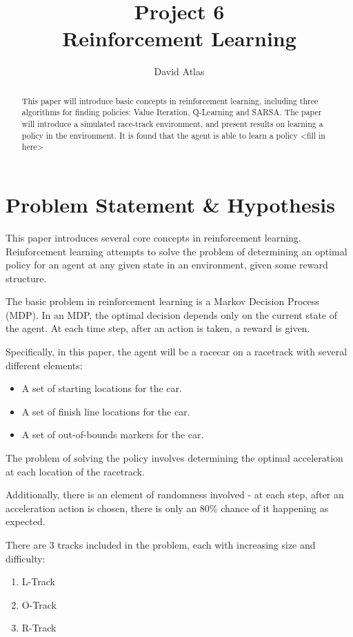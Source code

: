 \documentclass{amsart}
\title{Project 6 \\ Reinforcement Learning}
\author{David Atlas}
\begin{document}
    \begin{abstract}
    This paper will introduce basic concepts in reinforcement
    learning, including three algorithms for finding policies: Value Iteration, Q-Learning and SARSA.
        The paper will introduce a simulated race-track environment, and present results on
        learning a policy in the environment. It is found that the agent is able
        to learn a policy <fill in here>
    \end{abstract}
    \maketitle

    \section{Problem Statement \& Hypothesis}
    This paper introduces several core concepts in reinforcement learning. Reinforcement
    learning attempts to solve the problem of determining an optimal policy for an agent at any
    given state in an environment, given some reward structure.

    The basic problem in reinforcement learning is a Markov Decision Process (MDP).
    In an MDP, the optimal decision depends only on the current state of the agent. At each time step,
    after an action is taken, a reward is given.

    Specifically, in this paper, the agent will be a racecar on a racetrack with several different
    elements:
    \begin{itemize}
        \item A set of starting locations for the car.
        \item A set of finish line locations for the car.
        \item A set of out-of-bounds markers for the car.
    \end{itemize}

    The problem of solving the policy involves determining the optimal acceleration at each location of the racetrack.

    Additionally, there is an element of randomness involved - at each step, after an acceleration
    action is chosen, there is only an 80\% chance of it happening as expected.

    There are 3 tracks included in the problem, each with increasing size and difficulty:
    \begin{enumerate}
        \item L-Track
        \item O-Track
        \item R-Track
    \end{enumerate}
\end{document}
